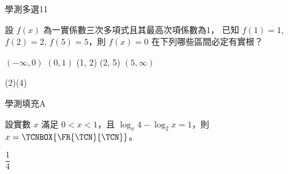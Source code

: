     \begin{QUESTION}
        \begin{ExamInfo}{96}{學測}{多選}{11}
        \end{ExamInfo}
        \begin{ExamAnsRateInfo}{22}{35}{16}{15}
        \end{ExamAnsRateInfo}
        \begin{QBODY}
            設 $f(x)$ 為一實係數三次多項式且其最高次項係數為1， 已知 $f(1)=1$, $f(2)=2$, $f(5)=5$，則 $f(x) = 0$ 在下列哪些區間必定有實根？ 
			\begin{QOPS} 
				\QOP $(-\infty , 0)$ 
				\QOP  $(0, 1)$ 
				\QOP (1, 2) 
				\QOP (2, 5) 
				\QOP $(5, \infty)$ 
			\end{QOPS}
        \end{QBODY}
        \begin{QFROMS}
        \end{QFROMS}
        \begin{QTAGS}\end{QTAGS}
        \begin{QANS}
            (2)(4)
        \end{QANS}
        \begin{QSOLLIST}
        \end{QSOLLIST}
        \begin{QEMPTYSPACE}
        \end{QEMPTYSPACE}
    \end{QUESTION}
    \begin{QUESTION}
        \begin{ExamInfo}{96}{學測}{填充}{A}
        \end{ExamInfo}
        \begin{ExamAnsRateInfo}{41}{77}{36}{10}
        \end{ExamAnsRateInfo}
        \begin{QBODY}
            設實數 $x$ 滿足 $0<x<1$，且 $\log_x 4 - \log_2 x=1$，則 $x=\TCNBOX{\FR{\TCN}{\TCN}}$。
        \end{QBODY}
        \begin{QFROMS}
        \end{QFROMS}
        \begin{QTAGS}\end{QTAGS}
        \begin{QANS}
            $\dfrac{1}{4}$
        \end{QANS}
        \begin{QSOLLIST}
        \end{QSOLLIST}
        \begin{QEMPTYSPACE}
        \end{QEMPTYSPACE}
    \end{QUESTION}
